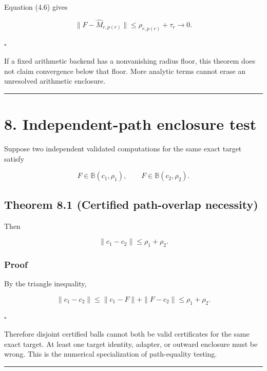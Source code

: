 Equation (4.6) gives

\[
\|F-\widehat M_{r,p(r)}\|
\le\rho_{r,p(r)}+\tau_r\to0.
\]

\(\square\)

If a fixed arithmetic backend has a nonvanishing radius floor, this theorem
does not claim convergence below that floor. More analytic terms cannot erase
an unresolved arithmetic enclosure.

\begin{center}\rule{0.5\linewidth}{0.5pt}\end{center}

\hypertarget{independent-path-enclosure-test}{%
\section{8. Independent-path enclosure test}\label{independent-path-enclosure-test}}

Suppose two independent validated computations for the same exact target satisfy

\[
F\in\mathbb B(c_1,\rho_1),
\qquad
F\in\mathbb B(c_2,\rho_2).
\tag{8.1}
\]

\hypertarget{theorem-8.1-certified-path-overlap-necessity}{%
\subsection{Theorem 8.1 (Certified path-overlap necessity)}\label{theorem-8.1-certified-path-overlap-necessity}}

Then

\[
\boxed{\|c_1-c_2\|\le\rho_1+\rho_2.}
\tag{8.2}
\]

\hypertarget{proof-2}{%
\subsubsection{Proof}\label{proof-2}}

By the triangle inequality,

\[
\|c_1-c_2\|
\le\|c_1-F\|+\|F-c_2\|
\le\rho_1+\rho_2.
\]

\(\square\)

Therefore disjoint certified balls cannot both be valid certificates for the
same exact target. At least one target identity, adapter, or outward enclosure
must be wrong. This is the numerical specialization of path-equality testing.

\begin{center}\rule{0.5\linewidth}{0.5pt}\end{center}

